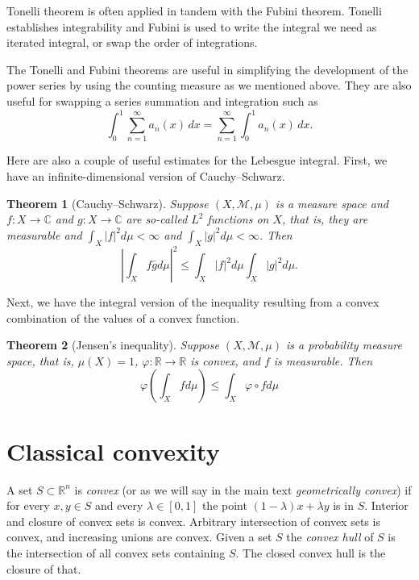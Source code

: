 \documentclass[12pt,openany]{book}
\newcommand{\sabs}[1]{\lvert {#1} \rvert}
\newcommand{\abs}[1]{\left\lvert {#1} \right\rvert}
\newcommand{\C}{{\mathbb{C}}}
\newcommand{\R}{{\mathbb{R}}}
\newcommand{\sM}{{\mathscr{M}}}
\newcommand{\myindex}[1]{#1\index{#1}}
\theoremstyle{plain}
\newtheorem{thm}{Theorem}[section]
\theoremstyle{remark}
\theoremstyle{definition}
\theoremstyle{exercise}
\theoremstyle{example}
\begin{document}
Tonelli theorem is often applied in tandem with the Fubini theorem.  Tonelli
establishes integrability and Fubini is used to write the integral we need
as iterated integral, or swap the order of integrations.

The Tonelli and Fubini theorems are useful in simplifying the
development of the power series by using the counting measure as we
mentioned above.  They are also useful for swapping a series summation and
integration such as
\begin{equation*}
\int_0^1 \sum_{n=1}^\infty a_n(x) \, dx
=
\sum_{n=1}^\infty \int_0^1 a_n(x) \, dx .
\end{equation*}

\pagebreak[2]
Here are also a couple of useful estimates for the Lebesgue integral.
First, we have an infinite-dimensional version of Cauchy--Schwarz.

\begin{thm}[Cauchy--Schwarz]
Suppose $(X,\sM,\mu)$ is a measure space and $f \colon X \to \C$ and
$g \colon X \to \C$
are so-called $L^2$ functions on $X$, that is,
they are measurable and
$\int_X \sabs{f}^2 d\mu < \infty$ and
$\int_X \sabs{g}^2 d\mu < \infty$.  Then
\begin{equation*}
\abs{
\int_X f \bar{g} d\mu
}^2
\leq
\int_X \sabs{f}^2 d\mu
\int_X \sabs{g}^2 d\mu .
\end{equation*}
\end{thm}

Next, we have the integral version of the inequality
resulting from a convex combination of the values of a convex function.

\begin{thm}[Jensen's inequality]
Suppose $(X,\sM,\mu)$ is a probability measure space, that is, $\mu(X)=1$,
$\varphi \colon \R \to \R$ is convex, and $f$ is measurable.  Then
\begin{equation*}
\varphi \left(
\int_X f d\mu
\right)
\leq
\int_X \varphi \circ f d\mu
\end{equation*}
\end{thm}


\section{Classical convexity} \label{apsec:convexity}

A set $S \subset \R^n$ is \emph{convex}
(or as we will say in the main text
\emph{\myindex{geometrically convex}})
if for every $x,y \in S$ and every $\lambda \in [0,1]$ the
point $(1-\lambda) x + \lambda y$ is in $S$.
Interior and closure of convex sets is convex.
Arbitrary intersection of convex sets is convex, and increasing unions
are convex.  Given a set $S$ the \emph{\myindex{convex hull}} of $S$ is
the intersection of all convex sets containing $S$.  The closed convex hull
is the closure of that.
\end{document}
